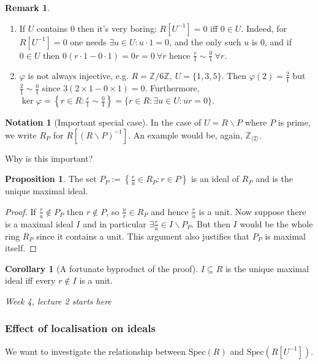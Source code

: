 \documentclass[a4paper]{article}
\newcommand{\Spec}{\text{Spec}}
\theoremstyle{definition}
\newtheorem{prop}[defn]{Proposition}
\newtheorem{coro}[defn]{Corollary}
\newtheorem*{remark}{Remark}
\newtheorem*{notation}{Notation}
\begin{document}
\begin{remark}
\begin{enumerate}
\item If $U$ contains 0 then it's very boring: $R[U^{-1}]=0$ iff $0\in U$. Indeed, for $R[U^{-1}]=0$ one needs $\exists u\in U:u\cdot 1=0$, and the only such $u$ is 0, and if $0\in U$ then $0(r\cdot1-0\cdot 1)=0r=0 \ \forall r$ hence $\frac{r}{1}\sim\frac01 \ \forall r$.
\item $\varphi$ is not always injective, e.g. $R=\mathbb Z/6\mathbb Z,\ U=\{1,3,5\}$. Then $\varphi(2)=\frac21$ but $\frac21 \sim \frac01$ since $3(2\times 1-0\times 1)=0$. Furthermore, $\ker\varphi=\left\{r\in R:\frac{r}{1}\sim \frac01\right\}=\{r\in R:\exists u\in U:ur=0\}$.
\end{enumerate}
\end{remark}

\begin{notation}[Important special case]
In the case of $U=R\backslash P$ where $P$ is prime, we write $R_P$ for $R[(R\backslash P)^{-1}]$. An example would be, again, $\mathbb Z_{\langle2\rangle}$.
\end{notation}
Why is this important?
\begin{prop}
The set $P_P:=\left\{\frac{r}{u}\in R_P:r\in P\right\}$ is an ideal of $R_P$ and is the unique maximal ideal.
\end{prop}
\begin{proof}
If $\frac{r}{u}\notin P_P$ then $r\notin P$, so $\frac{u}{r}\in R_P$ and hence $\frac{r}{u}$ is a unit. Now suppose there is a maximal ideal $I$ and in particular $\exists \frac{r}{u}\in I\backslash P_P$. But then $I$ would be the whole ring $R_P$ since it contains a unit. This argument also justifies that $P_P$ is maximal itself.
\end{proof}

\begin{coro}[A fortunate byproduct of the proof]
$I\subseteq R$ is the unique maximal ideal iff every $r\notin I$ is a unit.
\end{coro}

\begin{flushright}
\textit{Week 4, lecture 2 starts here}
\end{flushright}

\subsubsection{Effect of localisation on ideals}
We want to investigate the relationship between $\Spec(R)$ and $\Spec(R[U^{-1}])$.
\end{document}

